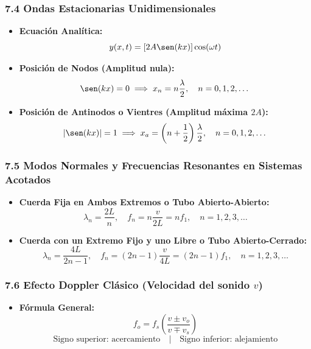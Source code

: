\documentclass[11pt,a4paper]{article}
\begin{document}
\subsubsection*{7.4 Ondas Estacionarias Unidimensionales}

\begin{itemize}
  \item \textbf{Ecuación Analítica:}
  \[
    y(x, t) = [2A \sen(kx)] \cos(\omega t)
  \]
  \item \textbf{Posición de Nodos (Amplitud nula):}
  \[
    \sen(kx) = 0 \implies x_n = n \frac{\lambda}{2}, \quad n = 0, 1, 2, \dots
  \]
  \item \textbf{Posición de Antinodos o Vientres (Amplitud máxima $2A$):}
  \[
    |\sen(kx)| = 1 \implies x_a = \left( n + \frac{1}{2} \right) \frac{\lambda}{2}, \quad n = 0, 1, 2, \dots
  \]
\end{itemize}

\subsubsection*{7.5 Modos Normales y Frecuencias Resonantes en Sistemas Acotados}

\begin{itemize}
  \item \textbf{Cuerda Fija en Ambos Extremos o Tubo Abierto-Abierto:}
  \[
    \lambda_n = \frac{2L}{n}, \quad f_n = n \frac{v}{2L} = n f_1, \quad n = 1, 2, 3, \dots
  \]
  \item \textbf{Cuerda con un Extremo Fijo y uno Libre o Tubo Abierto-Cerrado:}
  \[
    \lambda_n = \frac{4L}{2n - 1}, \quad f_n = (2n - 1) \frac{v}{4L} = (2n - 1) f_1, \quad n = 1, 2, 3, \dots
  \]
\end{itemize}

\subsubsection*{7.6 Efecto Doppler Clásico (Velocidad del sonido $v$)}

\begin{itemize}
  \item \textbf{Fórmula General:}
  \[
    f_o = f_s \left( \frac{v \pm v_o}{v \mp v_s} \right)
  \]
  \[
    \text{Signo superior: acercamiento} \quad | \quad \text{Signo inferior: alejamiento}
  \]
\end{itemize}
\end{document}
